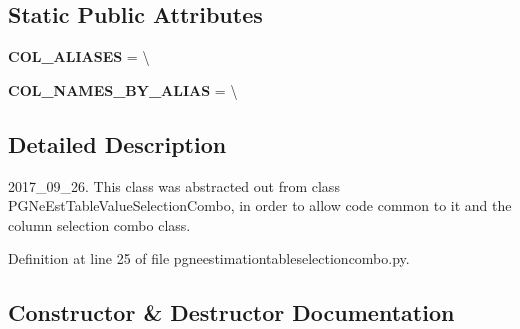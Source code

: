 \subsection*{Static Public Attributes}
\begin{DoxyCompactItemize}
\item 
{\bfseries C\+O\+L\+\_\+\+A\+L\+I\+A\+S\+ES} = \textbackslash{}\hypertarget{classnegui_1_1pgneestimationtableselectioncombo_1_1PGNeEstTableSelectionCombo_ab635eb8a9e1c6cf0e2670929409cf052}{}\label{classnegui_1_1pgneestimationtableselectioncombo_1_1PGNeEstTableSelectionCombo_ab635eb8a9e1c6cf0e2670929409cf052}

\item 
{\bfseries C\+O\+L\+\_\+\+N\+A\+M\+E\+S\+\_\+\+B\+Y\+\_\+\+A\+L\+I\+AS} = \textbackslash{}\hypertarget{classnegui_1_1pgneestimationtableselectioncombo_1_1PGNeEstTableSelectionCombo_aad6e98cac56be534d2a075612880e12f}{}\label{classnegui_1_1pgneestimationtableselectioncombo_1_1PGNeEstTableSelectionCombo_aad6e98cac56be534d2a075612880e12f}

\end{DoxyCompactItemize}


\subsection{Detailed Description}
\begin{DoxyVerb}2017_09_26. This class was abstracted out from 
class PGNeEstTableValueSelectionCombo, in order to 
allow code common to it and the column selection combo
class.
\end{DoxyVerb}
 

Definition at line 25 of file pgneestimationtableselectioncombo.\+py.



\subsection{Constructor \& Destructor Documentation}
